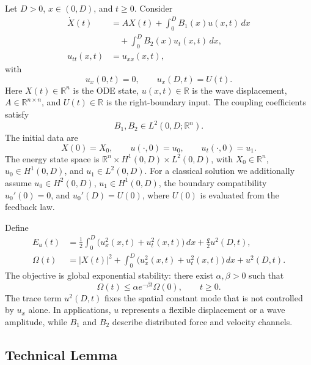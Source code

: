 \documentclass[journal]{IEEEtran}
\newcommand{\R}{\mathbb R}
\newcommand{\abs}[1]{\left|#1\right|}
\begin{document}
Let \(D>0\), \(x\in(0,D)\), and \(t\geq0\). Consider
\begin{align}
 \dot X(t)&=AX(t)+\int_0^D B_1(x)u(x,t)\,dx\\
 &\quad+\int_0^D B_2(x)u_t(x,t)\,dx, \label{eq:model_ode}\\
 u_{tt}(x,t)&=u_{xx}(x,t), \label{eq:model_wave}
\end{align}
with
\begin{equation}
 u_x(0,t)=0,\qquad u_x(D,t)=U(t). \label{eq:model_bc}
\end{equation}
Here \(X(t)\in\R^n\) is the ODE state, \(u(x,t)\in\R\) is the wave displacement, \(A\in\R^{n\times n}\), and \(U(t)\in\R\) is the right-boundary input. The coupling coefficients satisfy
\begin{equation}
 B_1,B_2\in L^2(0,D;\R^n). \label{eq:L2_couplings}
\end{equation}
The initial data are
\begin{equation}
 X(0)=X_0,\qquad u(\cdot,0)=u_0,\qquad u_t(\cdot,0)=u_1. \label{eq:initial_data}
\end{equation}
The energy state space is \(\R^n\times H^1(0,D)\times L^2(0,D)\), with \(X_0\in\R^n\), \(u_0\in H^1(0,D)\), and \(u_1\in L^2(0,D)\). For a classical solution we additionally assume \(u_0\in H^2(0,D)\), \(u_1\in H^1(0,D)\), the boundary compatibility \(u_0'(0)=0\), and \(u_0'(D)=U(0)\), where \(U(0)\) is evaluated from the feedback law.

Define
\begin{align}
 E_u(t)&=\frac12\int_0^D\big(u_x^2(x,t)+u_t^2(x,t)\big)\,dx
       +\frac q2u^2(D,t), \label{eq:Eu_def}\\
 \Omega(t)&=\abs{X(t)}^2+\int_0^D\big(u_x^2(x,t)+u_t^2(x,t)\big)\,dx+u^2(D,t). \label{eq:Omega}
\end{align}
The objective is global exponential stability: there exist \(\alpha,\beta>0\) such that
\begin{equation}
 \Omega(t)\leq \alpha e^{-\beta t}\Omega(0),\qquad t\geq0. \label{eq:objective}
\end{equation}
The trace term \(u^2(D,t)\) fixes the spatial constant mode that is not controlled by \(u_x\) alone. In applications, \(u\) represents a flexible displacement or a wave amplitude, while \(B_1\) and \(B_2\) describe distributed force and velocity channels.

\subsection{Technical Lemma}
\end{document}
